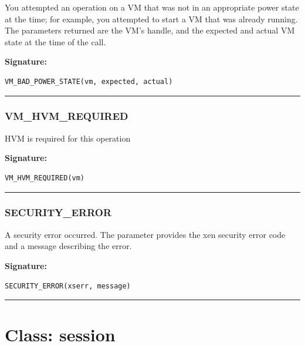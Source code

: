 You attempted an operation on a VM that was not in an appropriate power
state at the time; for example, you attempted to start a VM that was
already running.  The parameters returned are the VM's handle, and the
expected and actual VM state at the time of the call.

\vspace{0.3cm}
{\bf Signature:}
\begin{verbatim}VM_BAD_POWER_STATE(vm, expected, actual)\end{verbatim}
\begin{center}\rule{10em}{0.1pt}\end{center}

\subsubsection{VM\_HVM\_REQUIRED}

HVM is required for this operation

\vspace{0.3cm}
{\bf Signature:}
\begin{verbatim}VM_HVM_REQUIRED(vm)\end{verbatim}
\begin{center}\rule{10em}{0.1pt}\end{center}

\subsubsection{SECURITY\_ERROR}

A security error occurred. The parameter provides the xen security
error code and a message describing the error.

\vspace{0.3cm}
{\bf Signature:}
\begin{verbatim}SECURITY_ERROR(xserr, message)\end{verbatim}
\begin{center}\rule{10em}{0.1pt}\end{center}


\newpage
\section{Class: session}
